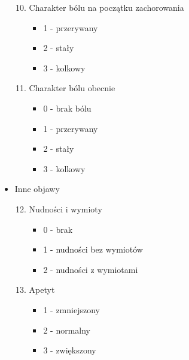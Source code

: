 \documentclass{report}
\begin{document}
\begin{itemize}
\begin{enumerate}
            \setcounter{enumi}{9}
            \item Charakter bólu na początku zachorowania
            \begin{itemize}
                \item 1 - przerywany
                \item 2 - stały
                \item 3 - kolkowy
            \end{itemize}
        \end{enumerate}
        \begin{enumerate}
            \setcounter{enumi}{10}
            \item Charakter bólu obecnie
            \begin{itemize}
                \item 0 - brak bólu
                \item 1 - przerywany
                \item 2 - stały
                \item 3 - kolkowy
            \end{itemize}
        \end{enumerate}
        \item Inne objawy
        \begin{enumerate}
            \setcounter{enumi}{11}
            \item Nudności i wymioty
            \begin{itemize}
                \item 0 - brak
                \item 1 - nudności bez wymiotów
                \item 2 - nudności z wymiotami
            \end{itemize}
        \end{enumerate}
        \begin{enumerate}
            \setcounter{enumi}{12}
            \item Apetyt
            \begin{itemize}
                \item 1 - zmniejszony
                \item 2 - normalny
                \item 3 - zwiększony
            \end{itemize}
        \end{enumerate}
        \begin{enumerate}
            \setcounter{enumi}{13}

\end{enumerate}
\end{itemize}
\end{document}
